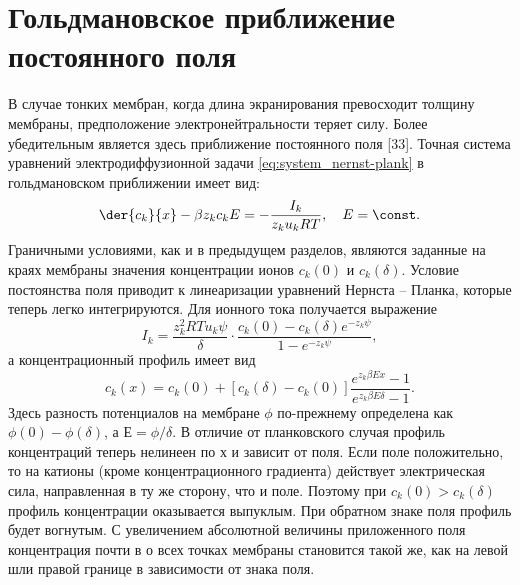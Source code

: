 \section{Гольдмановское приближение постоянного поля}
В случае тонких мембран, когда длина экранирования превосходит толщину мембраны,
предположение электронейтральности теряет силу. Более убедительным является
здесь приближение постоянного поля [33]. Точная система уравнений
электродиффузионной задачи \eqref{eq:system_nernst-plank} в гольдмановском
приближении имеет вид:
\begin{equation}
    \der{c_k}{x} - \beta z_k c_k E = - \frac{I_k}{z_k u_k RT},\quad E = \const.
\end{equation}
Граничными условиями, как и в предыдущем разделов, являются заданные на краях
мембраны значения концентрации ионов \( c_k(0) \) и \( c_k(\delta) \). Условие
постоянства поля приводит к линеаризации уравнений Нернста -- Планка, которые
теперь легко интегрируются. Для ионного тока получается выражение
\begin{equation}
    I_k = \frac{z_k^2 RT u_k \psi}{\delta}\cdot
        \frac{c_k(0) - c_k(\delta)e^{-z_k\psi}}{1 - e^{-z_k\psi}},
        \label{eq:goldman_currents}
\end{equation}
а концентрационный профиль имеет вид
\begin{equation}
    c_k(x) = c_k(0) +
    [c_k(\delta) - c_k(0)]\frac{e^{z_k\beta Ex} - 1}{e^{z_k\beta E\delta} - 1}.
\end{equation}
Здесь разность потенциалов на мембране \( \phi \) по-прежнему определена как
\( \phi(0) - \phi(\delta) \), а \( Е = \phi/\delta \). В отличие от планковского
случая профиль концентраций теперь нелинеен по х и зависит от поля. Если поле
положительно, то на катионы (кроме концентрационного градиента) действует
электрическая сила, направленная в ту же сторону, что и поле. Поэтому при
\( c_k(0) > c_k(\delta) \) профиль концентрации оказывается выпуклым. При
обратном знаке поля профиль будет вогнутым. С увеличением абсолютной величины
приложенного поля концентрация почти в о всех точках мембраны становится такой
же, как на левой шли правой границе в зависимости от знака поля.

